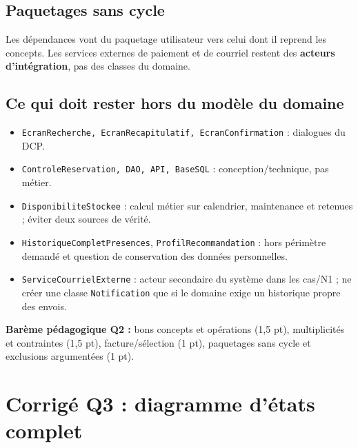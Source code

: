 \documentclass[10pt,a4paper]{article}
\begin{document}
\subsection{Paquetages sans cycle}
\begin{center}
\end{center}
Les dépendances vont du paquetage utilisateur vers celui dont il reprend les concepts. Les services externes de paiement et de courriel restent des \textbf{acteurs d'intégration}, pas des classes du domaine.
\subsection{Ce qui doit rester hors du modèle du domaine}
\begin{itemize}
\item \texttt{EcranRecherche, EcranRecapitulatif, EcranConfirmation} : dialogues du DCP.
\item \texttt{ControleReservation, DAO, API, BaseSQL} : conception/technique, pas métier.
\item \texttt{DisponibiliteStockee} : calcul métier sur calendrier, maintenance et retenues ; éviter deux sources de vérité.
\item \texttt{HistoriqueCompletPresences}, \texttt{ProfilRecommandation} : hors périmètre demandé et question de conservation des données personnelles.
\item \texttt{ServiceCourrielExterne} : acteur secondaire du système dans les cas/N1 ; ne créer une classe \texttt{Notification} que si le domaine exige un historique propre des envois.
\end{itemize}
\begin{answerbox}
\textbf{Barème pédagogique Q2 :} bons concepts et opérations (1,5 pt), multiplicités et contraintes (1,5 pt), facture/sélection (1 pt), paquetages sans cycle et exclusions argumentées (1 pt).
\end{answerbox}

\section{Corrigé Q3 : diagramme d'états complet}
\end{document}
